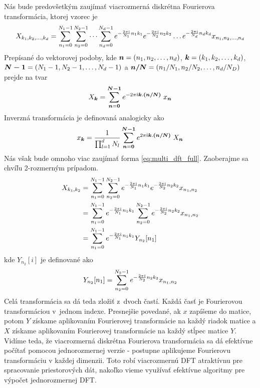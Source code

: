 Nás bude predovšetkým zaujímať viacrozmerná diskrétna Fourierova
transformácia, ktorej vzorec je
\begin{equation}
    X_{k_1,k_2,\dots,k_d} = \sum_{n_1=0}^{N_1-1}
        \sum_{n_2=0}^{N_2-1} \dots \sum_{n_d=0}^{N_d-1}
        e^{-\frac{2\pi\hat{\imath}}{N_1} n_1 k_1}
        e^{-\frac{2\pi\hat{\imath}}{N_2} n_2 k_2} \dots
        e^{-\frac{2\pi\hat{\imath}}{N_d} n_d k_d}
        x_{n_1,n_2,\dots,n_d}
    \label{eq:multi_dft_full}
\end{equation}
Prepísané do vektorovej podoby, kde $\boldsymbol{n}=(n_1,n_2,\dots,n_d)$,
$\boldsymbol{k}=(k_1,k_2,\dots,k_d)$,
$\boldsymbol{N-1}=(N_1-1,N_2-1,\dots,N_d-1)$ a $\boldsymbol{n/N}=(n_1/N_1,
n_2/N_2, \dots, n_d/N_D)$ prejde na tvar
\begin{equation*}
    X_{\boldsymbol{k}} = \sum_{\boldsymbol{n}=\boldsymbol{0}}^{\boldsymbol{N-1}}
      e^{-2\pi\hat{\imath} \boldsymbol{k}.\boldsymbol{(n/N)}} \;x_{\boldsymbol{n}}
\end{equation*}
Inverzná transformácia je definovaná analogicky ako
\begin{equation*}
    x_{\boldsymbol{k}} = \frac{1}{\prod_{l=1}^{d} N_l} 
            \sum_{\boldsymbol{n}=\boldsymbol{0}}^{\boldsymbol{N-1}}
                e^{2\pi\hat{\imath} \boldsymbol{k}.\boldsymbol{(n/N)}}\; X_{\boldsymbol{n}}
\end{equation*}
Nás však bude omnoho viac zaujímať forma \eqref{eq:multi_dft_full}.
Zaoberajme sa chvíľu 2-rozmerným prípadom.
\begin{equation*}
    \begin{split}
    X_{k_1,k_2} &=
        \sum_{n_1=0}^{N_1-1}
        \sum_{n_2=0}^{N_2-1} 
        e^{-\frac{2\pi\hat{\imath}}{N_1} n_1 k_1}
        e^{-\frac{2\pi\hat{\imath}}{N_2} n_2 k_2} 
        x_{n_1,n_2} \\&=
        \sum_{n_1=0}^{N_1-1}
        e^{-\frac{2\pi\hat{\imath}}{N_1} n_1 k_1}
        \sum_{n_2=0}^{N_2-1} 
        e^{-\frac{2\pi\hat{\imath}}{N_2} n_2 k_2} 
        x_{n_1,n_2} \\&=
        \sum_{n_1=0}^{N_1-1}
        e^{-\frac{2\pi\hat{\imath}}{N_1} n_1 k_1}
          Y_{n_2}[n_1]
    \end{split}
\end{equation*}
kde $Y_{n_2}[i]$ je definované ako
\begin{equation*}
    Y_{n_2}[n_1]=
        \sum_{n_2=0}^{N_2-1} e^{-\frac{2\pi\hat{\imath}}{N_2} n_2 k_2} x_{n_1,n_2}
\end{equation*}
Celá transformácia sa dá teda zložiť z~dvoch častí. Každá časť je
Fourierovou transformáciou v~jednom indexe. Presnejšie povedané, ak
$x$ zapíšeme do matice, potom $Y$ získame aplikovaním Fourierovej
transformácie na každý riadok matice a $X$ získame aplikovaním
Fourierovej transformácie na každý stĺpec matice $Y$.
Vidíme teda, že viacrozmerná diskrétna Fourierova transformácia sa dá
efektívne počítať pomocou jednorozmernej verzie - postupne aplikujeme
Fourierovu transformáciu v každej dimenzii. Toto robí viacrozmernú DFT
atraktívnu pre spracovanie priestorových dát, nakoľko
vieme využívať efektívne algoritmy pre výpočet jednorozmernej DFT.
